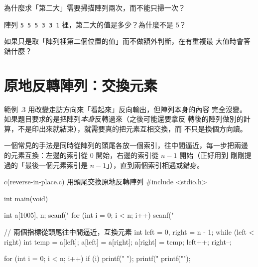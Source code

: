 
\begin{drills}[label=drills:array-second-largest]
\item 為什麼求「第二大」需要掃描陣列兩次，而不能只掃一次？
\item 陣列 \texttt{5 5 5 3 3 1} 裡，第二大的值是多少？為什麼不是 $5$？
\item 如果只是取「陣列裡第二個位置的值」而不做額外判斷，在有重複最
大值時會答錯什麼？
\end{drills}

\section{原地反轉陣列：交換元素}
\label{sec:array-reverse-swap}

範例 \thechapter.3 用改變走訪方向來「看起來」反向輸出，但陣列本身的內容
完全沒變。 如果題目要求的是把陣列\emph{本身}反轉過來（之後可能還要拿反
轉後的陣列做別的計算，不是印出來就結束），就需要真的把元素互相交換，而
不只是換個方向讀。

一個常見的手法是同時從陣列的頭尾各放一個索引，往中間逼近，每一步把兩邊
的元素互換：左邊的索引從 $0$ 開始，右邊的索引從 $n - 1$ 開始（正好用到
剛剛提過的「最後一個元素索引是 $n - 1$」），直到兩個索引相遇或錯身。

\begin{center}
\label{fig:ch06-reverse-two-pointer}
\end{center}

\begin{example}{c}{(reverse-in-place.c) 用頭尾交換原地反轉陣列}
#include <stdio.h>

int main(void) {
    int a[1005], n;
    scanf("%
    for (int i = 0; i < n; i++) {
        scanf("%
    }

    // 兩個指標從頭尾往中間逼近，互換元素
    int left = 0, right = n - 1;
    while (left < right) {
        int temp = a[left];
        a[left] = a[right];
        a[right] = temp;
        left++;
        right--;
    }

    for (int i = 0; i < n; i++) {
        if (i) {
            printf(" ");
        }
        printf("%
    }
    printf("\n");
}
\end{example}

